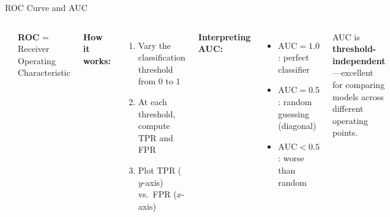 \documentclass[aspectratio=169,11pt]{beamer}
\begin{document}
\begin{frame}{ROC Curve and AUC}
\begin{columns}[T]
\begin{center}
\end{center}

\textbf{ROC} = Receiver Operating Characteristic

\vspace{0.3em}
\textbf{How it works:}
\begin{enumerate}
  \item Vary the classification threshold from $0$ to $1$
  \item At each threshold, compute TPR and FPR
  \item Plot TPR ($y$-axis) vs.\ FPR ($x$-axis)
\end{enumerate}

\vspace{0.3em}
\textbf{Interpreting AUC:}
\begin{itemize}
  \item $\text{AUC}=1.0$: perfect classifier
  \item $\text{AUC}=0.5$: random guessing (diagonal)
  \item $\text{AUC}<0.5$: worse than random
\end{itemize}

\vspace{0.3em}
\begin{exampleblock}{}
AUC is \textbf{threshold-independent}---excellent for comparing models across different operating points.
\end{exampleblock}
\end{columns}
\end{frame}
\end{document}
